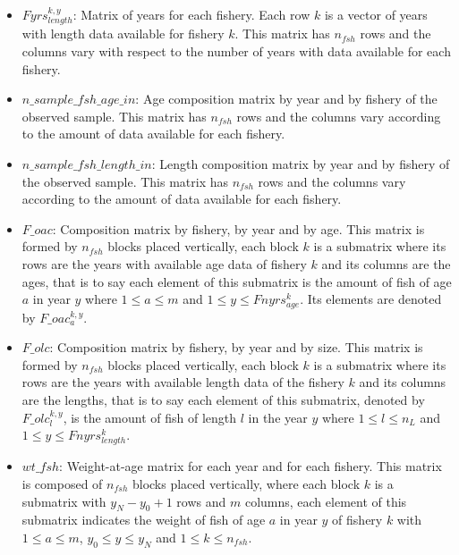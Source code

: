 \documentclass{article}
\begin{document}
\begin{itemize}
    \item $Fyrs^{k,y}_{length}$: Matrix of years for each fishery. Each row $k$ is a vector of years with length data available for fishery $k$. This matrix has $n_{fsh}$ rows and the columns vary with respect to the number of years with data available for each fishery.
    \item $n\_sample\_fsh\_age\_in$: Age composition matrix by year and by fishery of the observed sample. This matrix has $n_{fsh}$ rows and the columns vary according to the amount of data available for each fishery.

    
     \item $n\_sample\_fsh\_length\_in$: Length composition matrix by year and by fishery of the observed sample. This matrix has $n_{fsh}$ rows and the columns vary according to the amount of data available for each fishery.
    \item $F\_oac$: Composition matrix by fishery, by year and by age.  This matrix is formed by $n_{fsh}$ blocks placed vertically, each block $k$ is a submatrix where its rows are the years with available age data of fishery $k$ and its columns are the ages, that is to say each element of this submatrix is the amount of fish of age $a$ in year $y$ where $1\leq a \leq m$ and $1\leq y \leq Fnyrs^k_{age}$. Its elements are denoted by $F\_oac^{k,y}_a$.
    \item $F\_olc$: Composition matrix by fishery, by year and by size.  This matrix is formed by $n_{fsh}$ blocks placed vertically, each block $k$ is a submatrix where its rows are the years with available length data of the fishery $k$ and its columns are the lengths, that is to say each element of this submatrix, denoted by $F\_olc^{k,y}_l$, is the amount of fish of length $l$ in the year $y$ where $1\leq l \leq n_L$ and $1\leq y \leq Fnyrs^k_{length}$.
    \item $wt\_fsh$: Weight-at-age matrix for each year and for each fishery. This matrix is composed of $n_{fsh}$ blocks placed vertically, where each block $k$ is a submatrix with $y_N-y_0+1$ rows and $m$ columns, each element of this submatrix indicates the weight of fish of age $a$ in year $y$ of fishery $k$ with $1\leq a \leq m$, $y_0\leq y \leq y_N$ and $1\leq k \leq n_{fsh}$.

\end{itemize}
\end{document}
